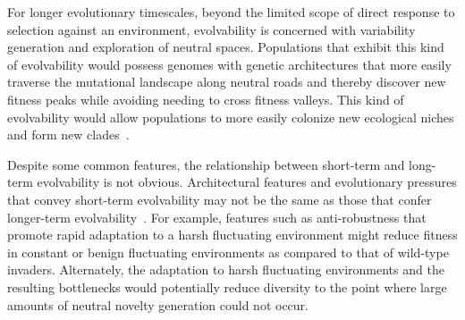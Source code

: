 \documentclass[10pt,letterpaper]{article}
\begin{document}
For longer evolutionary timescales, beyond the limited scope of direct response to selection against an environment, 
evolvability is concerned with variability generation and exploration of neutral spaces.
Populations that exhibit this kind of evolvability would possess genomes with genetic architectures
that more easily traverse the mutational landscape along neutral roads and thereby discover new fitness peaks while avoiding needing to cross fitness valleys.
This kind of evolvability would allow populations to more easily colonize new ecological niches and form new clades~\cite{kirschner_evolvability_1998,brookfield_evolution:_2001}.

Despite some common features, the relationship between short-term and long-term evolvability is not obvious. Architectural features and evolutionary pressures that convey short-term evolvability may not be the same as those that confer longer-term evolvability~\cite{pigliucci_is_2008}. For example, features such as anti-robustness that promote rapid adaptation to a harsh fluctuating environment might reduce fitness in constant or benign fluctuating environments as compared to that of wild-type invaders. Alternately, the adaptation to harsh fluctuating environments and the resulting bottlenecks would potentially reduce diversity to the point where large amounts of neutral novelty generation could not occur. 
\end{document}

